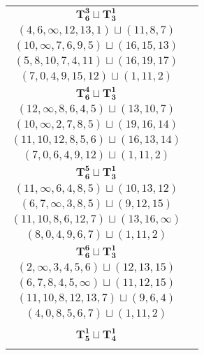 \documentclass{article}
\begin{document}
\begin{longtable}{|c|c|}
        \hline
        $\mathbf{T_{6}^{3}} \sqcup \mathbf{T_{3}^{1}}$ & \begin{tabular}{c}
        $(5,4,2,3,6,0)\sqcup(9,\infty,11)$ \\ 
        $(4,6,\infty,12,13,1)\sqcup(11,8,7)$ \\ 
        $(10,\infty,7,6,9,5)\sqcup(16,15,13)$ \\ 
        $(5,8,10,7,4,11)\sqcup(16,19,17)$ \\ 
        $(7,0,4,9,15,12)\sqcup(1,11,2)$
        \end{tabular} \\ 
        \hline
        $\mathbf{T_{6}^{4}} \sqcup \mathbf{T_{3}^{1}}$ & \begin{tabular}{c}
        $(5,4,7,2,1,3)\sqcup(8,11,\infty)$ \\ 
        $(12,\infty,8,6,4,5)\sqcup(13,10,7)$ \\ 
        $(10,\infty,2,7,8,5)\sqcup(19,16,14)$ \\ 
        $(11,10,12,8,5,6)\sqcup(16,13,14)$ \\ 
        $(7,0,6,4,9,12)\sqcup(1,11,2)$
        \end{tabular} \\ 
        \hline
        $\mathbf{T_{6}^{5}} \sqcup \mathbf{T_{3}^{1}}$ & \begin{tabular}{c}
        $(1,2,4,5,0,3)\sqcup(8,11,14)$ \\ 
        $(11,\infty,6,4,8,5)\sqcup(10,13,12)$ \\ 
        $(6,7,\infty,3,8,5)\sqcup(9,12,15)$ \\ 
        $(11,10,8,6,12,7)\sqcup(13,16,\infty)$ \\ 
        $(8,0,4,9,6,7)\sqcup(1,11,2)$
        \end{tabular} \\ 
        \hline
        $\mathbf{T_{6}^{6}} \sqcup \mathbf{T_{3}^{1}}$ & \begin{tabular}{c}
        $(1,2,0,3,4,5)\sqcup(11,8,\infty)$ \\ 
        $(2,\infty,3,4,5,6)\sqcup(12,13,15)$ \\ 
        $(6,7,8,4,5,\infty)\sqcup(11,12,15)$ \\ 
        $(11,10,8,12,13,7)\sqcup(9,6,4)$ \\ 
        $(4,0,8,5,6,7)\sqcup(1,11,2)$
        \end{tabular} \\ 
        \hline
        $\mathbf{T_{5}^{1}} \sqcup \mathbf{T_{4}^{1}}$ & \begin{tabular}{c}

\end{tabular}
\end{longtable}
\end{document}
